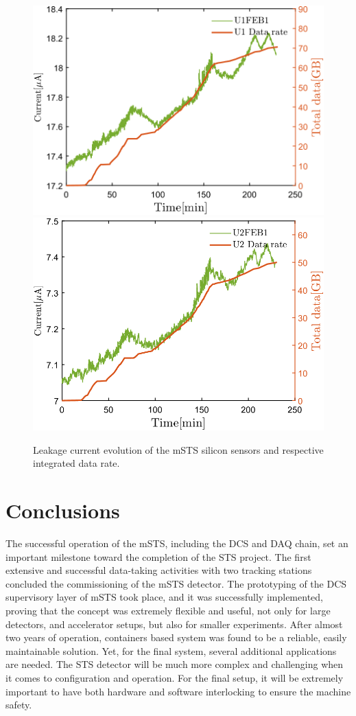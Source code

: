 \begin{figure}[!h]
\centering
\includegraphics[width=0.48\columnwidth]{Chapter6/DCS/images/U1_data_rate.png}
\includegraphics[width=0.48\columnwidth]{Chapter6/DCS/images/U2_data_rate.png}
\caption{Leakage current evolution of the \gls{mSTS} silicon sensors and respective integrated data rate.}
\label{fig_Data}
\end{figure}

\section{Conclusions}

The successful operation of the \gls{mSTS}, including the \gls{DCS} and \gls{DAQ} chain, set an important milestone toward the completion of the \gls{STS} project. The first extensive and successful data-taking activities with two tracking stations concluded the commissioning of the \gls{mSTS} detector. The prototyping of the \gls{DCS} supervisory layer of \gls{mSTS} took place, and it was successfully implemented, proving that the concept was extremely flexible and useful, not only for large detectors, and accelerator setups, but also for smaller experiments. After almost two years of operation, containers based system was found to be a reliable, easily maintainable solution. Yet, for the final system, several additional applications are needed. The \gls{STS} detector will be much more complex and challenging when it comes to configuration and operation. For the final setup, it will be extremely important to have both hardware and software interlocking to ensure the machine safety.

